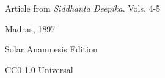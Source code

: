 \documentclass[a4paper, 12pt, oneside, english, twocolumn]{article}
\begin{document}
\begin{titlepage}
	

        {Article from \emph{Siddhanta Deepika}. Vols. 4-5}
        
	\vspace*{0.5\baselineskip} %
	
	Madras, 1897 %
	
	\vspace{0.5\baselineskip} %

    {\small Solar Anamnesis Edition} %
	
	{\small CC0 1.0 Universal } %
\end{titlepage}
\setlength{\parskip}{1mm plus1mm minus1mm}
\setcounter{tocdepth}{3}
\setcounter{secnumdepth}{3}
\clearpage
\small
\end{document}

